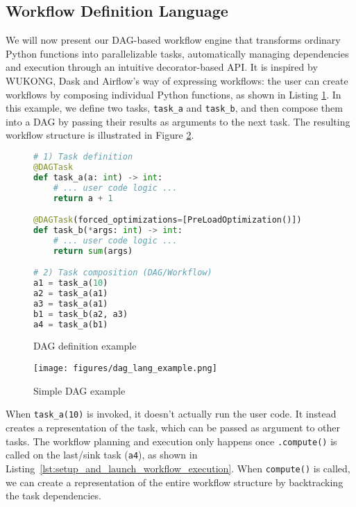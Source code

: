 \documentclass[conference]{IEEEtran}
\begin{document}
\subsection{Workflow Definition Language}
\label{ss:workflow_definition_language}

We will now present our DAG-based workflow engine that transforms ordinary Python functions into parallelizable tasks, automatically managing dependencies and execution through an intuitive decorator-based API. It is inspired by WUKONG, Dask and Airflow's way of expressing workflows: the user can create workflows by composing individual Python functions, as shown in Listing \ref{lst:dag_lang_example}. In this example, we define two tasks, \texttt{task\_a} and \texttt{task\_b}, and then compose them into a DAG by passing their results as arguments to the next task. The resulting workflow structure is illustrated in Figure \ref{fig:dag_lang_example}.

\begin{figure}[h]
\centering
\begin{lstlisting}[language=Python, basicstyle=\ttfamily\footnotesize, columns=fullflexible, breaklines=true]
# 1) Task definition
@DAGTask
def task_a(a: int) -> int:
    # ... user code logic ...
    return a + 1

@DAGTask(forced_optimizations=[PreLoadOptimization()])
def task_b(*args: int) -> int:
    # ... user code logic ...
    return sum(args)

# 2) Task composition (DAG/Workflow)
a1 = task_a(10)
a2 = task_a(a1)
a3 = task_a(a1)
b1 = task_b(a2, a3)
a4 = task_a(b1)
\end{lstlisting}
\caption{DAG definition example}
\label{lst:dag_lang_example}
\end{figure}

\begin{figure}[h]
    \centering
    \texttt{[image: figures/dag\_lang\_example.png]}
    \caption{Simple DAG example}
    \label{fig:dag_lang_example}
\end{figure}

When \texttt{task\_a(10)} is invoked, it doesn't actually run the user code. It instead creates a representation of the task, which can be passed as argument to other tasks. The workflow planning and execution only happens once \texttt{.compute()} is called on the last/sink task (\texttt{a4}), as shown in Listing~\ref{lst:setup_and_launch_workflow_execution}. When \texttt{compute()} is called, we can create a representation of the entire workflow structure by backtracking the task dependencies.
\end{document}
